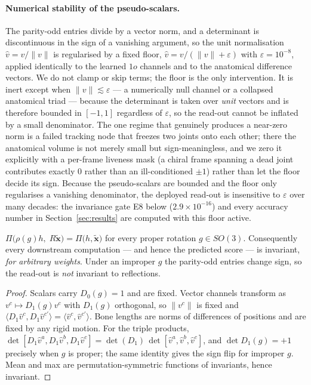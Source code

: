 \paragraph{Numerical stability of the pseudo-scalars.} The parity-odd entries divide by a vector
norm, and a determinant is discontinuous in the sign of a vanishing argument, so the unit
normalisation $\hat v=v/\|v\|$ is regularised by a fixed floor,
$\hat v=v/(\|v\|+\varepsilon)$ with $\varepsilon=10^{-8}$, applied identically to the learned $1o$
channels and to the anatomical difference vectors. We do not clamp or skip terms; the floor is the
only intervention. It is inert except when $\|v\|\lesssim\varepsilon$ --- a numerically null channel
or a collapsed anatomical triad --- because the determinant is taken over \emph{unit} vectors and is
therefore bounded in $[-1,1]$ regardless of $\varepsilon$, so the read-out cannot be inflated by a
small denominator. The one regime that genuinely produces a near-zero norm is a failed tracking node
that freezes two joints onto each other; there the anatomical volume is not merely small but
sign-meaningless, and we zero it explicitly with a per-frame liveness mask (a chiral frame spanning a
dead joint contributes exactly $0$ rather than an ill-conditioned $\pm1$) rather than let the floor
decide its sign. Because the pseudo-scalars are bounded and the floor only regularises a vanishing
denominator, the deployed read-out is insensitive to $\varepsilon$ over many decades: the invariance
gate E8 below ($2.9\times10^{-16}$) and every accuracy number in Section~\ref{sec:results} are computed
with this floor active.

\begin{proposition}
\label{prop:invariance}
$\Pi\big(\rho(g)h,\;R\tilde{\bm{x}}\big)=\Pi\big(h,\tilde{\bm{x}}\big)$ for every proper rotation
$g\in SO(3)$. Consequently every downstream computation --- and hence the predicted score --- is
invariant, \emph{for arbitrary weights}. Under an improper $g$ the parity-odd entries change sign, so
the read-out is \emph{not} invariant to reflections.
\end{proposition}
\begin{proof}
Scalars carry $D_0(g)=1$ and are fixed. Vector channels transform as $v^c\mapsto D_1(g)v^c$ with
$D_1(g)$ orthogonal, so $\|v^c\|$ is fixed and
$\langle D_1 \hat v^{c}, D_1 \hat v^{c'}\rangle=\langle \hat v^{c},\hat v^{c'}\rangle$. Bone lengths
are norms of differences of positions and are fixed by any rigid motion. For the triple products,
$\det[D_1\hat v^{a},D_1\hat v^{b},D_1\hat v^{c}]=\det(D_1)\,\det[\hat v^{a},\hat v^{b},\hat v^{c}]$,
and $\det D_1(g)=+1$ precisely when $g$ is proper; the same identity gives the sign flip for improper
$g$. Mean and max are permutation-symmetric functions of invariants, hence invariant.
\end{proof}

